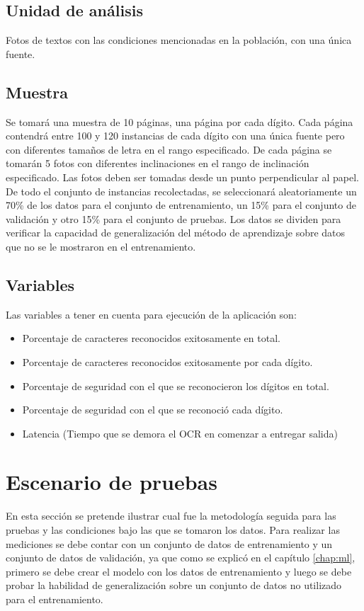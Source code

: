 \documentclass[a4paper, 11pt, oneside]{report}
\begin{document}
\subsection{Unidad de análisis}
Fotos de textos con las condiciones mencionadas en la población, con una única fuente.
\subsection{Muestra}
Se tomará una muestra de 10 páginas, una página por cada dígito. Cada página contendrá entre 100 y 120 instancias de cada dígito con una única fuente pero con diferentes tamaños de letra en el rango especificado. De cada página se tomarán 5 fotos con diferentes inclinaciones en el rango de inclinación especificado. Las fotos deben ser tomadas desde un punto perpendicular al papel. De todo el conjunto de instancias recolectadas, se seleccionará aleatoriamente un 70\% de los datos para el conjunto de entrenamiento, un 15\% para el conjunto de validación y otro 15\% para el conjunto de pruebas. Los datos se dividen para verificar la capacidad de generalización del método de aprendizaje sobre datos que no se le mostraron en el entrenamiento.
\subsection{Variables}
Las variables a tener en cuenta para ejecución de la aplicación son:
\begin{itemize}
\item Porcentaje de caracteres reconocidos exitosamente en total.
\item Porcentaje de caracteres reconocidos exitosamente por cada dígito.
\item Porcentaje de seguridad con el que se reconocieron los dígitos en total.
\item Porcentaje de seguridad con el que se reconoció cada dígito.
\item Latencia (Tiempo que se demora el OCR en comenzar a entregar salida)
\end{itemize}
\section{Escenario de pruebas}
\label{sect:testEnvironment}
En esta sección se pretende ilustrar cual fue la metodología seguida para las pruebas y las condiciones bajo las que se tomaron los datos. Para realizar las mediciones se debe contar con un conjunto de datos de entrenamiento y un conjunto de datos de validación, ya que como se explicó en el capítulo \ref{chap:ml}, primero se debe crear el modelo con los datos de entrenamiento y luego se debe probar la habilidad de generalización sobre un conjunto de datos no utilizado para el entrenamiento.
\end{document}
